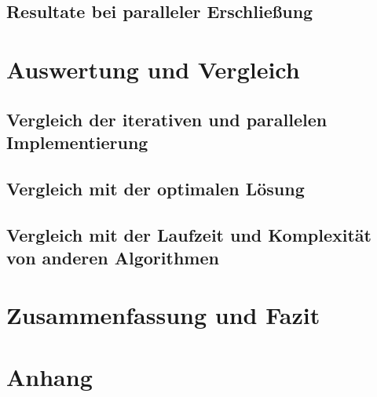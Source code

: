 \documentclass[doktyp=barbeit, sprache=german]{TUBAFarbeiten}
\begin{document}
\subsection{Resultate bei paralleler Erschließung}
\section{Auswertung und Vergleich}
\subsection{Vergleich der iterativen und parallelen Implementierung}
\subsection{Vergleich mit der optimalen Lösung}
\subsection{Vergleich mit der Laufzeit und Komplexität von anderen Algorithmen}
\section{Zusammenfassung und Fazit}
\section{Anhang}
\newpage
{}
\end{document}
